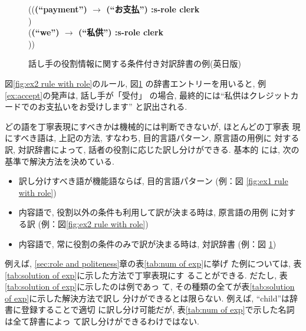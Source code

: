 \begin{figure}[htb]
\begin{center}
{\begin{minipage}{60mm}
\begin{tabbing}
(({\bf (``payment'') $\rightarrow$ (``お支払'') :s-role clerk} \\
\>) \\
\>({\bf (``we'') $\rightarrow$ (``私供'') :s-role clerk} \\
\>))

\end{tabbing}
    \end{minipage}}
  \caption{話し手の役割情報に関する条件付き対訳辞書の例(英日版)}
  \label{fig:ex dic with clerk}
  \end{center}

\end{figure}

図\ref{fig:ex2 rule with role}のルール, 図\ref{fig:ex dic with clerk}
の辞書エントリーを用いると, 例\ref{ex:accept}の発声は, 話し手が「受付」
の場合, 最終的には``私供はクレジットカードでのお支払いをお受けします''
と訳出される. 

どの語を丁寧表現にすべきかは機械的には判断できないが, ほとんどの丁寧表
現にすべき語は, 上記の方法, すなわち, 目的言語パターン, 原言語の用例に
対する訳, 対訳辞書によって, 話者の役割に応じた訳し分けができる. 基本的
には, 次の基準で解決方法を決めている.
\begin{itemize}
  \item 訳し分けすべき語が機能語ならば, 目的言語パターン (例：図
\ref{fig:ex1 rule with role})
  \item 内容語で, 役割以外の条件も利用して訳が決まる時は, 原言語の用例
に対する訳 (例：図\ref{fig:ex2 rule with role})
  \item 内容語で, 常に役割の条件のみで訳が決まる時は, 対訳辞書 (例：図
\ref{fig:ex dic with clerk})
\end{itemize}

例えば, \ref{sec:role and politeness}章の表\ref{tab:num of exp}に挙げ
た例については, 表\ref{tab:solution of exp}に示した方法で丁寧表現にす
ることができる. だたし, 表\ref{tab:solution of exp}に示したのは例であっ
て, その種類の全てが表\ref{tab:solution of exp}に示した解決方法で訳し
分けができるとは限らない. 例えば, ``child''は辞書に登録することで適切
に訳し分け可能だが, 表\ref{tab:num of exp}で示した名詞は全て辞書によっ
て訳し分けができるわけではない. 

